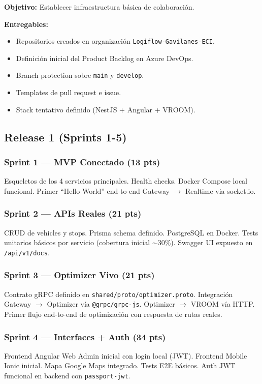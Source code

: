 \documentclass[12pt,a4paper,oneside]{article}
\begin{document}
\textbf{Objetivo:} Establecer infraestructura b\'asica de colaboraci\'on.

\textbf{Entregables:}
\begin{itemize}[leftmargin=*]
  \item Repositorios creados en organizaci\'on \texttt{Logiflow-Gavilanes-ECI}.
  \item Definici\'on inicial del Product Backlog en Azure DevOps.
  \item Branch protection sobre \texttt{main} y \texttt{develop}.
  \item Templates de pull request e issue.
  \item Stack tentativo definido (NestJS + Angular + VROOM).
\end{itemize}

\subsection{Release 1 (Sprints 1-5)}

\subsubsection*{Sprint 1 --- MVP Conectado (13 pts)}
Esqueletos de los 4 servicios principales. Health checks. Docker Compose local funcional. Primer ``Hello World'' end-to-end Gateway $\rightarrow$ Realtime via socket.io.

\subsubsection*{Sprint 2 --- APIs Reales (21 pts)}
CRUD de vehicles y stops. Prisma schema definido. PostgreSQL en Docker. Tests unitarios b\'asicos por servicio (cobertura inicial $\sim$30\%). Swagger UI expuesto en \texttt{/api/v1/docs}.

\subsubsection*{Sprint 3 --- Optimizer Vivo (21 pts)}
Contrato gRPC definido en \texttt{shared/proto/optimizer.proto}. Integraci\'on Gateway $\rightarrow$ Optimizer v\'ia \texttt{@grpc/grpc-js}. Optimizer $\rightarrow$ VROOM v\'ia HTTP. Primer flujo end-to-end de optimizaci\'on con respuesta de rutas reales.

\subsubsection*{Sprint 4 --- Interfaces + Auth (34 pts)}
Frontend Angular Web Admin inicial con login local (JWT). Frontend Mobile Ionic inicial. Mapa Google Maps integrado. Tests E2E b\'asicos. Auth JWT funcional en backend con \texttt{passport-jwt}.
\end{document}
